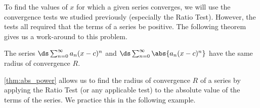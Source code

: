 To find the values of $x$ for which a given series converges, we will use the convergence tests we studied previously (especially the Ratio Test). However, the tests all required that the terms of a series be positive. The following theorem gives us a work-around to this problem.

{%
	The series $\ds \sum_{n=0}^\infty a_n(x-c)^n$ and $\ds \sum_{n=0}^\infty \abs{a_n(x-c)^n}$ have the same radius of convergence $R$.
}

\autoref{thm:abs_power} allows us to find the radius of convergence $R$ of a series by applying the Ratio Test (or any applicable test) to the absolute value of the terms of the series. We practice this in the following example.


